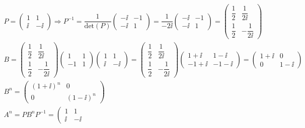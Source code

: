 \begin{gather*}
P =
\left( \begin{array}{cc}
1 & 1\\
\ii & -\ii
\end{array} \right) 
\Rightarrow P^{-1} = \dfrac{1}{\text{det}(P)}
\left( \begin{array}{cc}
-\ii & -1 \\
-\ii & 1
\end{array} \right) =  \dfrac{1}{-2 \ii}
\left( \begin{array}{cc}
-\ii & -1 \\
-\ii & 1
\end{array} \right) = 
\left( \begin{array}{cc}
\dfrac{1}{2} & \dfrac{1}{2\ii}\\
\dfrac{1}{2} & -\dfrac{1}{2\ii}
\end{array} \right)\\
B=
\left( \begin{array}{cc}
\dfrac{1}{2} & \dfrac{1}{2\ii}\\
\dfrac{1}{2} & -\dfrac{1}{2\ii}
\end{array} \right)
\left( \begin{array}{cc}
1 & 1\\
-1 & 1
\end{array} \right)
\left( \begin{array}{cc}
1 & 1\\
\ii & -\ii
\end{array} \right)
=
\left( \begin{array}{cc}
\dfrac{1}{2} & \dfrac{1}{2\ii}\\
\dfrac{1}{2} & -\dfrac{1}{2\ii}
\end{array} \right)
\left( \begin{array}{cc}
1+\ii & 1-\ii \\
-1+\ii & -1-\ii
\end{array} \right) 
=
\left( \begin{array}{cc}
1+\ii & 0\\
0 & 1-\ii
\end{array} \right)
\\
B^n =
\left( \begin{array}{cc}
(1+\ii)^n & 0\\
0 & (1-\ii)^n
\end{array} \right)
\\
A^n=PB^{n}P^{-1} =
\left( \begin{array}{cc}
1 & 1 \\
\ii & -\ii

\end{array}
\end{gather*}

